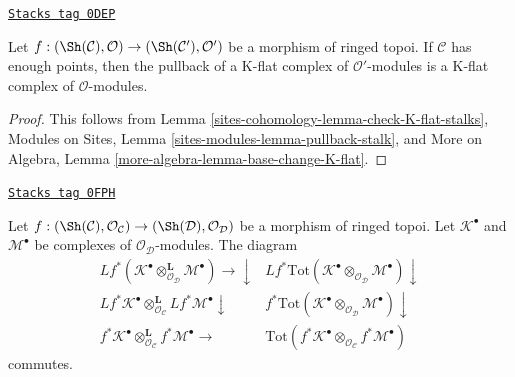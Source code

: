 \begin{lemma}
\label{sites-cohomology-lemma-pullback-K-flat-points}
\href{https://stacks.math.columbia.edu/tag/0DEP}{\texttt{Stacks tag 0DEP}}

Let $f : (\Sh(\mathcal{C}), \mathcal{O}) \to (\Sh(\mathcal{C}'), \mathcal{O}')$
be a morphism of ringed topoi. If $\mathcal{C}$ has enough points, then
the pullback of a K-flat complex of
$\mathcal{O}'$-modules is a K-flat complex of $\mathcal{O}$-modules.
\end{lemma}

\begin{proof}
This follows from Lemma \ref{sites-cohomology-lemma-check-K-flat-stalks},
Modules on Sites, Lemma \ref{sites-modules-lemma-pullback-stalk},
and
More on Algebra, Lemma \ref{more-algebra-lemma-base-change-K-flat}.
\end{proof}

\begin{lemma}
\label{sites-cohomology-lemma-tensor-pull-compatibility}
\href{https://stacks.math.columbia.edu/tag/0FPH}{\texttt{Stacks tag 0FPH}}

Let $f : (\Sh(\mathcal{C}), \mathcal{O}_\mathcal{C}) \to
(\Sh(\mathcal{D}), \mathcal{O}_\mathcal{D})$ be a morphism of ringed topoi.
Let $\mathcal{K}^\bullet$ and $\mathcal{M}^\bullet$
be complexes of $\mathcal{O}_\mathcal{D}$-modules.
The diagram
$$
\begin{array}{cc}Lf^*(\mathcal{K}^\bullet
\otimes_{\mathcal{O}_\mathcal{D}}^\mathbf{L}
\mathcal{M}^\bullet) \longrightarrow\downarrow & Lf^*\text{Tot}(\mathcal{K}^\bullet
\otimes_{\mathcal{O}_\mathcal{D}}
\mathcal{M}^\bullet) \downarrow \\ Lf^*\mathcal{K}^\bullet \otimes_{\mathcal{O}_\mathcal{C}}^\mathbf{L}
Lf^*\mathcal{M}^\bullet \downarrow & f^*\text{Tot}(\mathcal{K}^\bullet
\otimes_{\mathcal{O}_\mathcal{D}}
\mathcal{M}^\bullet) \downarrow \\ f^*\mathcal{K}^\bullet \otimes_{\mathcal{O}_\mathcal{C}}^\mathbf{L}
f^*\mathcal{M}^\bullet \longrightarrow & \text{Tot}(f^*\mathcal{K}^\bullet \otimes_{\mathcal{O}_\mathcal{C}}
f^*\mathcal{M}^\bullet)\end{array}
$$
commutes.
\end{lemma}

